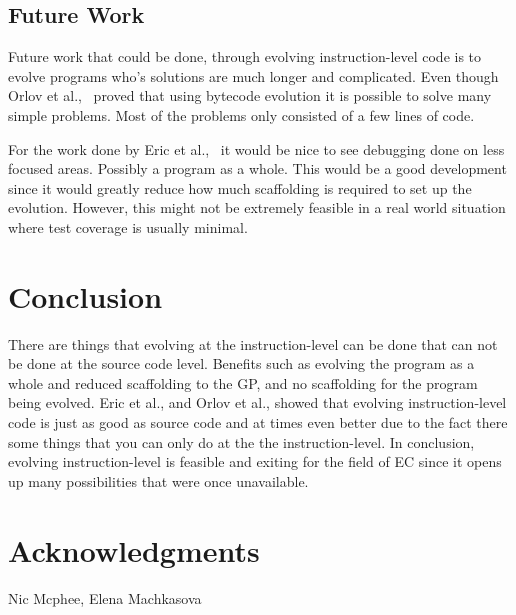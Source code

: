 \documentclass{sig-alternate}
\begin{document}
\subsection{Future Work}
Future work that could be done, through evolving instruction-level code is to evolve programs who's solutions are much longer and complicated. Even though Orlov et al.,~\cite{FINCH:2011} proved that using bytecode evolution it is possible to solve many simple problems. Most of the problems only consisted of a few lines of code.

For the work done by Eric et al.,~\cite{Assembly:2010} it would be nice to see debugging done on less focused areas. Possibly a program as a whole. This would be a good development since it would greatly reduce how much scaffolding is required to set up the evolution. However, this might not be extremely feasible in a real world situation where test coverage is usually minimal.


\section{Conclusion}
There are things that evolving at the instruction-level can be done that can not be done at the source code level. Benefits such as evolving the program as a whole and reduced scaffolding to the GP, and no scaffolding for the program being evolved. Eric et al., and Orlov et al., showed that evolving instruction-level code is just as good as source code and at times even better due to the fact there some things that you can only do at the the instruction-level. In conclusion, evolving instruction-level is feasible and exiting for the field of EC since it opens up many possibilities that were once unavailable.

\section{Acknowledgments}
Nic Mcphee, Elena Machkasova

%

%
%
\end{document}
